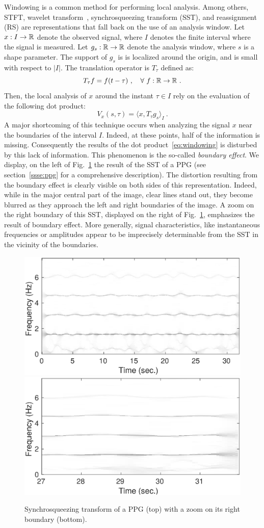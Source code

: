 \documentclass[journal]{IEEEtran}
\begin{document}
Windowing is a common method for performing local analysis. Among others, STFT, wavelet transform~\cite{Mallat99wavelet}, synchrosqueezing transform (SST), and reassignment~\cite{Auger13time} (RS) are representations that fall back on the use of an analysis window. Let $x:I\to{\mathbb R}$ denote the observed signal, where $I$ denotes the finite interval where the signal is measured. Let $g_s:{\mathbb R}\to{\mathbb R}$ denote the analysis window, where $s$ is a shape parameter. The support of $g_s$ is is localized around the origin, and is small with respect to $|I|$. The translation operator is $T_\tau$ defined as:
\[
T_\tau f = f(t-\tau)\ ,\quad \forall\ f:{\mathbb R}\to{\mathbb R}\ .
\]
Then, the local analysis of $x$ around the instant $\tau\in I$ rely on the evaluation of the following dot product:
\begin{equation}
V_x(s,\tau) = \langle x, T_\tau g_s \rangle_I \ .
\label{eq:windowing}
\end{equation}
A major shortcoming of this technique occurs when analyzing the signal $x$ near the boundaries of the interval $I$. Indeed, at these points, half of the information is missing. Consequently the results of the dot product~\ref{eq:windowing} is disturbed by this lack of information. This phenomenon is the so-called \emph{boundary effect}. We display, on the left of Fig.~\ref{fig:ex.intro} the result of the SST of a PPG (see section~\ref{ssse:ppg} for a comprehensive description). The distortion resulting from the boundary effect is clearly visible on both sides of this representation. Indeed, while in the major central part of the image, clear lines stand out, they become blurred as they approach the left and right boundaries of the image. A zoom on the right boundary of this SST, displayed on the right of Fig.~\ref{fig:ex.intro}, emphasizes the result of boundary effect. More generally, signal characteristics, like instantaneous frequencies or amplitudes appear to be imprecisely determinable from the SST in the vicinity of the boundaries.

\begin{figure}
\centering
\includegraphics[width=.48\textwidth]{SSTintro.eps}
\includegraphics[width=.48\textwidth]{zoomSSTintro.eps}
\caption{Synchrosqueezing transform of a PPG (top) with a zoom on its right boundary (bottom). }
\label{fig:ex.intro}
\end{figure}
\end{document}
